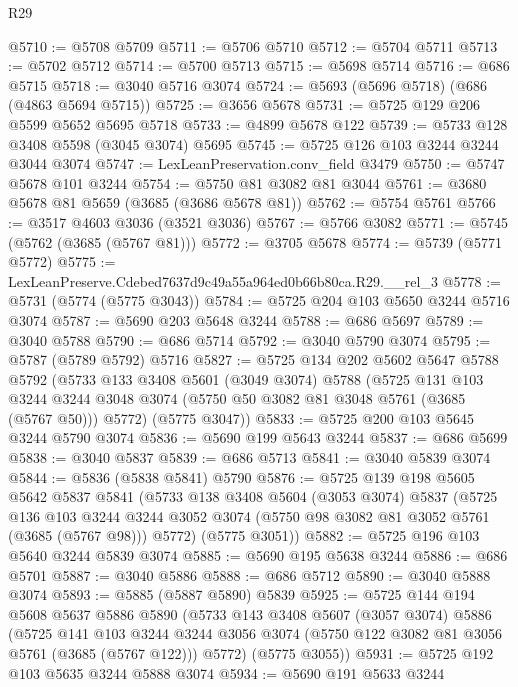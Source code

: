 \begin{lexlean}{R29}
\begin{coremodule}
@5710 := @5708 @5709
@5711 := @5706 @5710
@5712 := @5704 @5711
@5713 := @5702 @5712
@5714 := @5700 @5713
@5715 := @5698 @5714
@5716 := @686 @5715
@5718 := @3040 @5716 @3074
@5724 := @5693 (@5696 @5718) (@686 (@4863 @5694 @5715))
@5725 := @3656 @5678
@5731 := @5725 @129 @206 @5599 @5652 @5695 @5718
@5733 := @4899 @5678 @122
@5739 := @5733 @128 @3408 @5598 (@3045 @3074) @5695
@5745 := @5725 @126 @103 @3244 @3244 @3044 @3074
@5747 := LexLeanPreservation.conv_field @3479
@5750 := @5747 @5678 @101 @3244
@5754 := @5750 @81 @3082 @81 @3044
@5761 := @3680 @5678 @81 @5659 (@3685 (@3686 @5678 @81))
@5762 := @5754 @5761
@5766 := @3517 @4603 @3036 (@3521 @3036)
@5767 := @5766 @3082
@5771 := @5745 (@5762 (@3685 (@5767 @81)))
@5772 := @3705 @5678
@5774 := @5739 (@5771 @5772)
@5775 := LexLeanPreserve.Cdebed7637d9c49a55a964ed0b66b80ca.R29.__rel_3
@5778 := @5731 (@5774 (@5775 @3043))
@5784 := @5725 @204 @103 @5650 @3244 @5716 @3074
@5787 := @5690 @203 @5648 @3244
@5788 := @686 @5697
@5789 := @3040 @5788
@5790 := @686 @5714
@5792 := @3040 @5790 @3074
@5795 := @5787 (@5789 @5792) @5716
@5827 := @5725
    @134
    @202
    @5602
    @5647
    @5788
    @5792
    (@5733
      @133
      @3408
      @5601
      (@3049 @3074)
      @5788
      (@5725
        @131
        @103
        @3244
        @3244
        @3048
        @3074
        (@5750 @50 @3082 @81 @3048 @5761 (@3685 (@5767 @50)))
        @5772)
      (@5775 @3047))
@5833 := @5725 @200 @103 @5645 @3244 @5790 @3074
@5836 := @5690 @199 @5643 @3244
@5837 := @686 @5699
@5838 := @3040 @5837
@5839 := @686 @5713
@5841 := @3040 @5839 @3074
@5844 := @5836 (@5838 @5841) @5790
@5876 := @5725
    @139
    @198
    @5605
    @5642
    @5837
    @5841
    (@5733
      @138
      @3408
      @5604
      (@3053 @3074)
      @5837
      (@5725
        @136
        @103
        @3244
        @3244
        @3052
        @3074
        (@5750 @98 @3082 @81 @3052 @5761 (@3685 (@5767 @98)))
        @5772)
      (@5775 @3051))
@5882 := @5725 @196 @103 @5640 @3244 @5839 @3074
@5885 := @5690 @195 @5638 @3244
@5886 := @686 @5701
@5887 := @3040 @5886
@5888 := @686 @5712
@5890 := @3040 @5888 @3074
@5893 := @5885 (@5887 @5890) @5839
@5925 := @5725
    @144
    @194
    @5608
    @5637
    @5886
    @5890
    (@5733
      @143
      @3408
      @5607
      (@3057 @3074)
      @5886
      (@5725
        @141
        @103
        @3244
        @3244
        @3056
        @3074
        (@5750 @122 @3082 @81 @3056 @5761 (@3685 (@5767 @122)))
        @5772)
      (@5775 @3055))
@5931 := @5725 @192 @103 @5635 @3244 @5888 @3074
@5934 := @5690 @191 @5633 @3244

\end{coremodule}
\end{lexlean}
